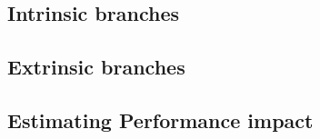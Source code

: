 
\subsection{Intrinsic branches}

\subsection{Extrinsic branches}

\subsection*{Estimating Performance impact}
